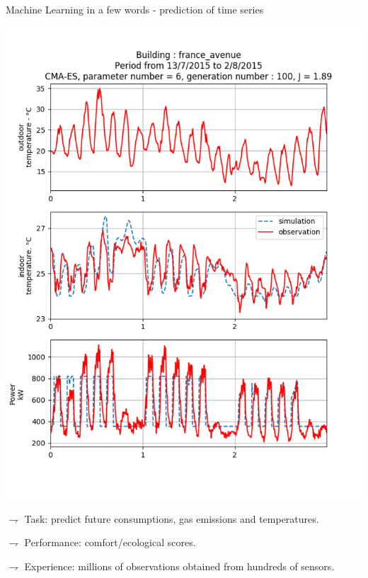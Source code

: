 \documentclass[9pt]{beamer}
\begin{document}
\begin{frame}{Machine Learning in a few words - prediction of time series}
\begin{center}
\includegraphics[scale = .3]{caliboze.png}
\end{center}

$\rightharpoondown$ \alert{Task}: predict future consumptions, gas emissions and temperatures.

$\rightharpoondown$ \alert{Performance}: comfort/ecological scores.

$\rightharpoondown$ \alert{Experience}: millions of observations obtained from hundreds of sensors.

\end{frame}
\end{document}
